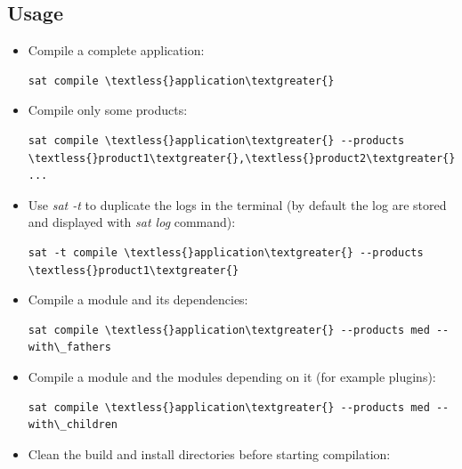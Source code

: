 \documentclass[a4paper,10pt,english]{sphinxmanual}
\begin{document}
\subsection{Usage}
\label{commands/compile:usage}\begin{itemize}
\item {} 
Compile a complete application:

\begin{Verbatim}[commandchars=\\\{\}]
sat compile \textless{}application\textgreater{}
\end{Verbatim}

\item {} 
Compile only some products:

\begin{Verbatim}[commandchars=\\\{\}]
sat compile \textless{}application\textgreater{} --products \textless{}product1\textgreater{},\textless{}product2\textgreater{} ...
\end{Verbatim}

\item {} 
Use \emph{sat -t} to duplicate the logs in the terminal (by default the log are stored and displayed with \emph{sat log} command):

\begin{Verbatim}[commandchars=\\\{\}]
sat -t compile \textless{}application\textgreater{} --products \textless{}product1\textgreater{}
\end{Verbatim}

\item {} 
Compile a module and its dependencies:

\begin{Verbatim}[commandchars=\\\{\}]
sat compile \textless{}application\textgreater{} --products med --with\_fathers
\end{Verbatim}

\item {} 
Compile a module and the modules depending on it (for example plugins):

\begin{Verbatim}[commandchars=\\\{\}]
sat compile \textless{}application\textgreater{} --products med --with\_children
\end{Verbatim}

\item {} 
Clean the build and install directories before starting compilation:


\end{itemize}
\end{document}
